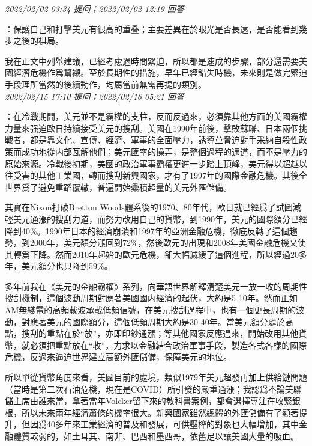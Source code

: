 \documentclass[twocolumn]{ctexart}
\begin{document}
\textit{\hfill\noindent\small 2022/02/02 03:34 提问；2022/02/02 12:19 回答}

：保護自己和打擊美元有很高的重叠；主要差異在於眼光是否長遠，是否能看到幾步之後的棋局。

我在正文中列舉建議，已經考慮過時間緊迫，所以都是速成的步驟，部分還需要美國經濟危機作爲幫襯。至於長期性的措施，早年已經錯失時機，未來則是做完緊迫手段理所當然的後續動作，均屬當前無需再提的類別。
\\

\textit{\hfill\noindent\small 2022/02/15 17:10 提问；2022/02/16 05:21 回答}

：在冷戰期間，美元並不是霸權的支柱，反而反過來，必須靠其他方面的美國霸權力量來强迫歐日持續接受美元的搜刮。美國在1990年前後，擊敗蘇聯、日本兩個挑戰者，都是靠文化、宣傳、經濟、軍事的全面壓力，誘導並脅迫對手采納自殺性政策而成功地從内部瓦解他們；美元匯率的操弄，是整個過程的通道，而不是壓力的原始來源。冷戰後初期，美國的政治軍事霸權更進一步踏上頂峰，美元得以超越以往受害的其他工業國，轉而搜刮新興國家，才有了1997年的國際金融危機。其後全世界爲了避免重蹈覆轍，普遍開始纍積超量的美元外匯儲備。

其實在Nixon打破Bretton Woods體系後的1970、80年代，歐日就已經爲了試圖減輕美元通漲的搜刮力道，而努力改用自己的貨幣，到1990年，美元的國際額分已經降到40\%。1990年日本的經濟崩潰和1997年的亞洲金融危機，徹底反轉了這個趨勢，到2000年，美元額分漲回到72\%，然後歐元的出現和2008年美國金融危機又使其轉爲下降。然而2010年起始的歐元危機，卻大幅減緩了這個進程，所以經過20多年，美元額分也只降到59\%。

多年前我在《美元的金融霸權》系列，向華語世界解釋清楚美元一放一收的周期性搜刮機制，這個波動周期對應著美國國内經濟的起伏，大約是5-10年。然而正如AM無綫電的高頻載波承載低頻信號，在美元搜刮過程中，也有一個更長周期的波動，對應著美元的國際額分，這個低頻周期大約是30-40年。當美元額分處於高點，搜刮的重點在於“放”，亦即印鈔通漲；等其他國家反應過來，開始改用其他貨幣，就必須把重點放在“收”，力求以金融結合政治軍事手段，製造各式各樣的國際危機，反過來逼迫世界建立高額外匯儲備，保障美元的地位。

所以單從貨幣角度來看，美國目前的處境，類似1979年美元超發再加上供給鏈問題（當時是第二次石油危機，現在是COVID）所引發的嚴重通漲；我認爲不論美聯儲主席由誰來當，拿著當年Volcker留下來的教科書案例，都會選擇專注在收緊銀根，所以未來兩年經濟蕭條的機率很大。新興國家雖然總體的外匯儲備有了顯著提升，但因爲40多年來工業經濟的普及和發展，可供壓榨的對象也大幅增加，其中金融體質較弱的，如土耳其、南非、巴西和墨西哥，依舊足以讓美國大量的吸血。
\end{document}
